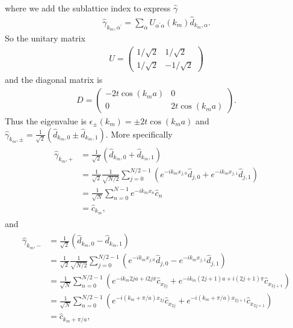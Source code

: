 \documentclass[10pt, oneside]{article}
\newcommand{\p}[1]{\left(#1\right)}
\begin{document}
where we add the sublattice index to express \(\hat{\gamma}\)
\begin{align}
	\hat{\gamma}_{k_m, \alpha^\prime} = \sum_{\alpha} U_{\alpha^\prime \alpha} \p{k_m} \hat{d}_{k_m, \alpha}.
\end{align}
So the unitary matrix
\begin{align}
	U  = \begin{pmatrix}
		1/\sqrt{2} & 1/\sqrt{2} \\
		1/\sqrt{2} & -1/\sqrt{2}
	\end{pmatrix}
\end{align}
and the diagonal matrix is 
\begin{align}
	D = \begin{pmatrix}
		-2t \cos\p{k_m a} & 0 \\ 
		0 & 2t \cos\p{k_m a}
	\end{pmatrix}.
\end{align}
Thus the eigenvalue is \(\epsilon_{\pm} \p{k_m} = \pm 2t \cos \p{k_m a}\) and \(\hat{\gamma}_{k_{m}, \pm} = \frac{1}{\sqrt{2}} \p{\hat{d}_{k_{m}, 0} \pm \hat{d}_{k_{m}, 1}}\). More specifically
\begin{align}
	\begin{split}
		\hat{\gamma}_{k_m, +} & = \frac{1}{\sqrt{2}} \p{\hat{d}_{k_{m}, 0} + \hat{d}_{k_{m}, 1}} \\
		& = \frac{1}{\sqrt{2}} \frac{1}{\sqrt{N/2}} \sum_{j = 0}^{N/2 - 1}\p{e^{- i k_{m} x_{j, 0}} \hat{d}_{j, 0}  + e^{-i k_{m} x_{j, 1}} \hat{d}_{j,1}} \\
		& = \frac{1}{\sqrt{N}} \sum_{n = 0}^{N - 1} e^{-i k_{m} x_{n}} \hat{c}_{n} \\
		& = \hat{c}_{k_{m}},
	\end{split}
\end{align}
and 
\begin{align}
	\begin{split}
		\hat{\gamma}_{k_m, -} & = \frac{1}{\sqrt{2}} \p{\hat{d}_{k_{m}, 0} - \hat{d}_{k_{m}, 1}} \\
		& = \frac{1}{\sqrt{2}} \frac{1}{\sqrt{N/2}} \sum_{j = 0}^{N/2 - 1}\p{e^{- i k_{m} x_{j, 0}} \hat{d}_{j, 0} - e^{-i k_{m} x_{j, 1}} \hat{d}_{j,1}} \\
		& = \frac{1}{\sqrt{N}} \sum_{n = 0}^{N/2 - 1} \p{e^{-i k_m 2j a  + i 2j \pi} \hat{c}_{x_{2j}} + e^{-i k_{m} \p{2j+1} a + i \p{2j + 1} \pi} \hat{c}_{x_{2j + 1}}} \\
		& = \frac{1}{\sqrt{N}} \sum_{n = 0}^{N/2 - 1} \p{e^{-i \p{k_{m} + \pi/a} x_{2j}} \hat{c}_{x_{2j}} + e^{-i \p{k_{m} + \pi/a} x_{2j + 1}} \hat{c}_{x_{2j + 1}} } \\
		& = \hat{c}_{k_{m} + \pi/a},
	\end{split}
\end{align}
\end{document}
